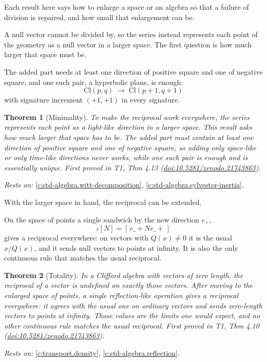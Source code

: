\documentclass[11pt]{article}
\newtheorem{theorem}{Theorem}[section]
\theoremstyle{definition}
\theoremstyle{plain}
\providecommand{\Cl}{}\renewcommand{\Cl}{\mathrm{Cl}}
\begin{document}
Each result here says how to enlarge a space or an algebra so that a failure of division is repaired, and how small that enlargement can be.

A null vector cannot be divided by, so the series instead represents each point of the geometry as a null vector in a larger space. The first question is how much larger that space must be.

The added part needs at least one direction of positive square and one of negative square, and one such pair, a hyperbolic plane, is enough: \[ \Cl(p,q) \;\longrightarrow\; \Cl(p{+}1, q{+}1) \] with signature increment $(+1,+1)$ in every signature.

\begin{theorem}[Minimality]\label{c:transport.minimality}
To make the reciprocal work everywhere, the series represents each point as a light-like direction in a larger space. This result asks how much larger that space has to be. The added part must contain at least one direction of positive square and one of negative square, so adding only space-like or only time-like directions never works, while one such pair is enough and is essentially unique.
\emph{First proved in} T1, Thm 4.13 (\href{https://doi.org/10.5281/zenodo.21743863}{doi:10.5281/zenodo.21743863}).
\end{theorem}
\noindent\emph{Rests on:} \ref{c:std-algebra.witt-decomposition}, \ref{c:std-algebra.sylvester-inertia}.

With the larger space in hand, the reciprocal can be extended.

On the space of points a single sandwich by the new direction $e_+$, \[ \iota[N] = [\,e\_+ N e\_+\,] \] gives a reciprocal everywhere: on vectors with $Q(x) \neq 0$ it is the usual $x/Q(x)$, and it sends null vectors to points at infinity. It is also the only continuous rule that matches the usual reciprocal.

\begin{theorem}[Totality]\label{c:transport.totality}
In a Clifford algebra with vectors of zero length, the reciprocal of a vector is undefined on exactly those vectors. After moving to the enlarged space of points, a single reflection-like operation gives a reciprocal everywhere: it agrees with the usual one on ordinary vectors and sends zero-length vectors to points at infinity. Those values are the limits one would expect, and no other continuous rule matches the usual reciprocal.
\emph{First proved in} T1, Thm 4.10 (\href{https://doi.org/10.5281/zenodo.21743863}{doi:10.5281/zenodo.21743863}).
\end{theorem}
\noindent\emph{Rests on:} \ref{c:transport.density}, \ref{c:std-algebra.reflection}.
\end{document}

